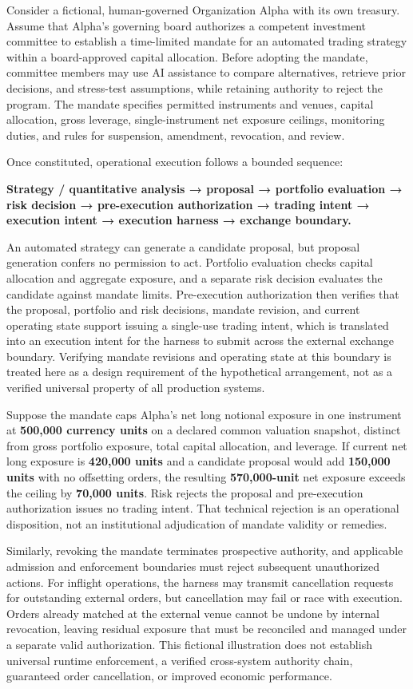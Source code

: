 \documentclass[
  10pt,
]{article}
\begin{document}
Consider a fictional, human-governed Organization Alpha with its own
treasury. Assume that Alpha's governing board authorizes a competent
investment committee to establish a time-limited mandate for an
automated trading strategy within a board-approved capital allocation.
Before adopting the mandate, committee members may use AI assistance to
compare alternatives, retrieve prior decisions, and stress-test
assumptions, while retaining authority to reject the program. The
mandate specifies permitted instruments and venues, capital allocation,
gross leverage, single-instrument net exposure ceilings, monitoring
duties, and rules for suspension, amendment, revocation, and review.

Once constituted, operational execution follows a bounded sequence:

\textbf{Strategy / quantitative analysis → proposal → portfolio
evaluation → risk decision → pre-execution authorization → trading
intent → execution intent → execution harness → exchange boundary.}

An automated strategy can generate a candidate proposal, but proposal
generation confers no permission to act. Portfolio evaluation checks
capital allocation and aggregate exposure, and a separate risk decision
evaluates the candidate against mandate limits. Pre-execution
authorization then verifies that the proposal, portfolio and risk
decisions, mandate revision, and current operating state support issuing
a single-use trading intent, which is translated into an execution
intent for the harness to submit across the external exchange boundary.
Verifying mandate revisions and operating state at this boundary is
treated here as a design requirement of the hypothetical arrangement,
not as a verified universal property of all production systems.

Suppose the mandate caps Alpha's net long notional exposure in one
instrument at \textbf{500,000 currency units} on a declared common
valuation snapshot, distinct from gross portfolio exposure, total
capital allocation, and leverage. If current net long exposure is
\textbf{420,000 units} and a candidate proposal would add
\textbf{150,000 units} with no offsetting orders, the resulting
\textbf{570,000-unit} net exposure exceeds the ceiling by \textbf{70,000
units}. Risk rejects the proposal and pre-execution authorization issues
no trading intent. That technical rejection is an operational
disposition, not an institutional adjudication of mandate validity or
remedies.

Similarly, revoking the mandate terminates prospective authority, and
applicable admission and enforcement boundaries must reject subsequent
unauthorized actions. For inflight operations, the harness may transmit
cancellation requests for outstanding external orders, but cancellation
may fail or race with execution. Orders already matched at the external
venue cannot be undone by internal revocation, leaving residual exposure
that must be reconciled and managed under a separate valid
authorization. This fictional illustration does not establish universal
runtime enforcement, a verified cross-system authority chain, guaranteed
order cancellation, or improved economic performance.
\end{document}
